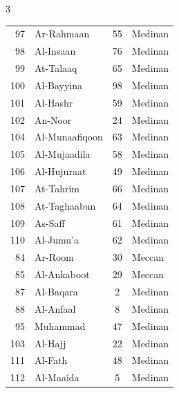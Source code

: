 \documentclass{article}
\begin{document}
\begin{center}
\begin{multicols}{3}
\begin{threeparttable}
\begin{tabular}{@{}r l c l@{}}
                97            & Ar-Rahmaan            & 55           & Medinan       \\
                98            & Al-Insaan             & 76           & Medinan       \\
                99            & At-Talaaq             & 65           & Medinan       \\
                100           & Al-Bayyina            & 98           & Medinan       \\
                101           & Al-Hashr              & 59           & Medinan       \\
                102           & An-Noor               & 24           & Medinan       \\
                104           & Al-Munaafiqoon        & 63           & Medinan       \\
                105           & Al-Mujaadila          & 58           & Medinan       \\
                106           & Al-Hujuraat           & 49           & Medinan       \\
                107           & At-Tahrim             & 66           & Medinan       \\
                108           & At-Taghaabun          & 64           & Medinan       \\
                109           & As-Saff               & 61           & Medinan       \\
                110           & Al-Jumu'a             & 62           & Medinan       \\
                84            & Ar-Room\tnote{32}     & 30           & Meccan        \\
                85            & Al-Ankaboot\tnote{33} & 29           & Meccan        \\
                87            & Al-Baqara\tnote{34}   & 2            & Medinan       \\
                88            & Al-Anfaal\tnote{35}   & 8            & Medinan       \\
                95            & Muhammad\tnote{36}    & 47           & Medinan       \\
                103           & Al-Hajj\tnote{37}     & 22           & Medinan       \\
                111           & Al-Fath\tnote{38}     & 48           & Medinan       \\
                112           & Al-Maaida\tnote{39}   & 5            & Medinan       \\

\end{tabular}
\end{threeparttable}
\end{multicols}
\end{center}
\end{document}
